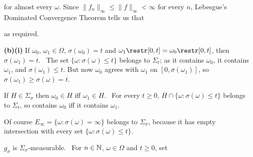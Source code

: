 {

\noindent
for almost every $\omega$.   Since
$\|f_n\|_{\infty}\le\|f\|_{\infty}<\infty$ for every $n$,
Lebesgue's Dominated Convergence Theorem tells us that


\noindent as required.

\medskip

{\bf (b)(i)} If $\omega_0$, $\omega_1\in\Omega$, $\sigma(\omega_0)=t$ and
$\omega_1\restr[0,t]=\omega_0\restr[0,t]$, then
$\sigma(\omega_1)=t$.
\Prf\ The set $\{\omega:\sigma(\omega)\le t\}$ belongs
to $\Sigma_t$;  as it contains $\omega_0$, it contains $\omega_1$, and
$\sigma(\omega_1)\le t$.   But now $\omega_0$ agrees with $\omega_1$ on
$[0,\sigma(\omega_1)]$, so $\sigma(\omega_1)\ge\sigma(\omega)=t$.\ \Qed

If $H\in\Sigma_{\sigma}$ then $\omega_0\in H$ iff $\omega_1\in H$.
\Prf\ For every $t\ge 0$,
$H\cap\{\omega:\sigma(\omega)\le t\}$ belongs to
$\Sigma_t$, so contains $\omega_0$ iff it contains $\omega_1$.\ \Qed

\medskip

 Of course
$E_{\infty}=\{\omega:\sigma(\omega)=\infty\}$ belongs to $\Sigma_{\sigma}$,
because it has empty intersection with every set
$\{\omega:\sigma(\omega)\le t\}$.


\medskip

 $g_{\sigma}$ is $\Sigma_{\sigma}$-measurable.   \Prf\
For $n\in\Bbb N$, $\omega\in\Omega$ and $t\ge 0$, set

}
